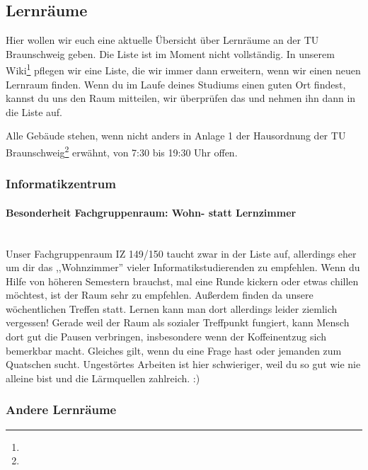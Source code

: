 
\subsection{Lernräume}


Hier wollen wir euch eine aktuelle Übersicht über Lernräume an der TU Braunschweig geben. Die Liste ist im Moment nicht vollständig. In unserem Wiki\footnote{} pflegen wir eine Liste, die wir immer dann erweitern, wenn wir einen neuen Lernraum finden. Wenn du im Laufe deines Studiums einen guten Ort findest, kannst du uns den Raum mitteilen, wir überprüfen das und nehmen ihn dann in die Liste auf. 

Alle Gebäude stehen, wenn nicht anders in Anlage 1 der Hausordnung der TU Braunschweig\footnote{} erwähnt, von 7:30 bis 19:30 Uhr offen.

\subsubsection*{Informatikzentrum}



\paragraph{Besonderheit Fachgruppenraum: Wohn- statt Lernzimmer}\ \\
Unser Fachgruppenraum IZ 149/150 taucht zwar in der Liste auf, allerdings eher um dir das  ,,Wohnzimmer'' vieler Informatikstudierenden  zu empfehlen. Wenn du  Hilfe von höheren Semestern brauchst, mal eine Runde kickern oder etwas chillen möchtest, ist der Raum sehr zu empfehlen. Außerdem finden da unsere wöchentlichen Treffen statt. Lernen kann man dort allerdings leider ziemlich vergessen! Gerade weil der Raum als sozialer Treffpunkt fungiert, kann Mensch dort gut die Pausen verbringen, insbesondere wenn der Koffeinentzug sich bemerkbar macht. Gleiches gilt, wenn du eine Frage hast oder jemanden zum Quatschen sucht. Ungestörtes Arbeiten ist hier schwieriger, weil du so gut wie nie alleine bist und die Lärmquellen zahlreich. :)

\subsubsection*{Andere Lernräume}


